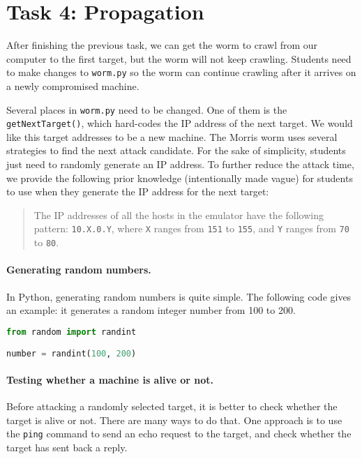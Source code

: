 \section{Task 4: Propagation} 


After finishing the previous task, we can get the worm to
crawl from our computer to the first target, but 
the worm will not keep crawling. Students need to make changes
to \texttt{worm.py} so the worm can continue crawling after
it arrives on a newly compromised machine. 

Several places in \texttt{worm.py} need to be changed.
One of them is the \texttt{getNextTarget()}, 
which hard-codes the IP address of the next target. 
We would like this target addresses to be a new machine. 
The Morris worm uses several strategies to find the next 
attack candidate. 
For the sake of simplicity,
students just need to randomly generate an IP address. 
To further reduce the attack time, we provide the 
following prior knowledge (intentionally made vague)
for students to use when
they generate the IP address for the next target:

\begin{quote}
    The IP addresses of all the hosts in the emulator have the following
    pattern: \texttt{10.X.0.Y}, where \texttt{X} ranges from 
    \texttt{151} to \texttt{155}, 
    and \texttt{Y} ranges from \texttt{70} to \texttt{80}.  
\end{quote}
 
\paragraph{Generating random numbers.}
In Python, generating random numbers is quite simple.
The following code gives an example: it generates a random 
integer number from 100 to 200.

\begin{lstlisting}[language=Python]
from random import randint

number = randint(100, 200)
\end{lstlisting}
 

\paragraph{Testing whether a machine is alive or not.}
Before attacking a randomly selected target, it is better
to check whether the target is alive or not. 
There are many ways to do that. 
One approach is to use the \texttt{ping} command to send 
an echo request to the target, and check
whether the target has sent back a reply.

